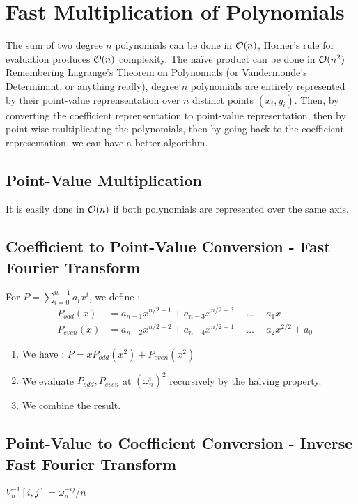 \documentclass{cours}
\begin{document}
\section{Fast Multiplication of Polynomials}
The sum of two degree $n$ polynomials can be done in $\mathcal{O}(n)$, Horner's rule for evaluation produces $\mathcal{O}(n)$ complexity. The naïve product can be done in $\mathcal{O}(n^2)$\\
Remembering Lagrange's Theorem on Polynomials (or Vandermonde's Determinant, or anything really), degree $n$ polynomials are entirely represented by their point-value reprensentation over $n$ distinct points $(x_{i}, y_{i})$.
Then, by converting the coefficient reprensentation to point-value representation, then by point-wise multiplicating the polynomials, then by going back to the coefficient representation, we can have a better algorithm.

\subsection{Point-Value Multiplication}
It is easily done in $\mathcal{O}(n)$ if both polynomials are represented over the same axis.

\subsection{Coefficient to Point-Value Conversion - Fast Fourier Transform}
For $P = \sum_{i = 0}^{n-1} a_{i}x^{i}$, we define : \[
  \begin{aligned}
    &P_{odd}(x) &= a_{n-1}x^{n/2-1} + a_{n-3}x^{n/2-3} + \ldots + a_{1}x\\
    &P_{even}(x) &= a_{n-2}x^{n/2-2} + a_{n-4}x^{n/2-4} + \ldots+ a_{2}x^{2/2} + a_{0}
  \end{aligned}  
\]
\begin{enumerate}
    \item We have : $P = xP_{odd}(x^{2}) + P_{even}(x^{2})$
    \item We evaluate $P_{odd}, P_{even}$ at $(\omega_{n}^{i})^{2}$ recursively by the halving property.
    \item We combine the result.
\end{enumerate}

\subsection{Point-Value to Coefficient Conversion - Inverse Fast Fourier Transform}
\begin{theorem}
    $V_{n}^{-1}[i, j] = \omega_{n}^{-ij}/n$
\end{theorem}
\end{document}

